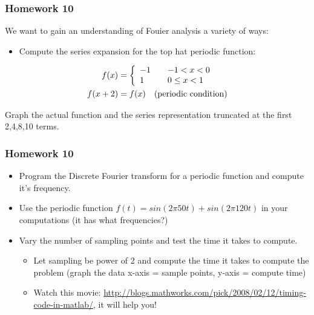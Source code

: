 \documentclass[serif]{beamer}
\begin{document}
\begin{frame}
\frametitle{Homework 10}

We want to gain an understanding of Fouier analysis a variety of ways: 

\begin{itemize}
\item Compute the series expansion for the top hat periodic function: 
\end{itemize}
\begin{align*}
f(x) &= \left\{
\begin{array}{l l}
-1& \quad -1<x < 0 \\
1 & \quad 0\leq x <1 
\end{array}
 \right.\\
 f(x+2) &= f(x) \quad  \textrm{(periodic condition)}
 \end{align*}

Graph the actual function and the series representation truncated at the first 2,4,8,10 terms. 
\end{frame}
%
\begin{frame}

\frametitle{Homework 10}

\begin{itemize}
\item Program the Discrete Fourier transform for a periodic function and compute it's frequency. 
\item Use the periodic function $f(t) = sin(2\pi 50 t) + sin(2\pi120 t)$ in your computations (it has what frequencies?) 
\item Vary the number of sampling points and test the time it takes to compute.
\begin{itemize}
\item  Let sampling be power of 2 and compute the time it takes to compute the problem (graph the data x-axis = sample points, y-axis = compute time)
\item Watch this movie: \url{http://blogs.mathworks.com/pick/2008/02/12/timing-code-in-matlab/}, it will help you! 
\end{itemize}
\end{itemize}

\end{frame}
\end{document}
